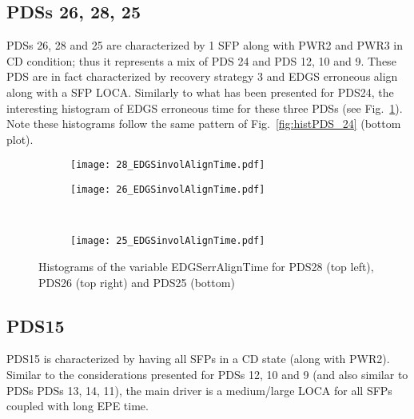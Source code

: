 \subsection{PDSs 26, 28, 25}
PDSs 26, 28 and 25 are characterized by 1 SFP along with PWR2 and PWR3 in CD condition; thus it 
represents a mix of PDS 24 and PDS 12, 10 and 9.
These PDS are in fact characterized by recovery strategy 3 and EDGS erroneous align along with a SFP LOCA.
Similarly to what has been presented for PDS24, the interesting histogram of EDGS erroneous time for 
these three PDSs (see Fig.~\ref{fig:histPDS_26_28_25_EDGSinvolAlignTime}). Note these histograms follow the same pattern 
of Fig.~\ref{fig:histPDS_24} (bottom plot).

\begin{figure}
  \begin{subfigure}{.5\linewidth}
    \centering
    \texttt{[image: 28\_EDGSinvolAlignTime.pdf]}
  \end{subfigure}%
  \begin{subfigure}{.5\linewidth}
    \centering
    \texttt{[image: 26\_EDGSinvolAlignTime.pdf]}
  \end{subfigure}\\[1ex]
  \begin{subfigure}{\linewidth}
    \centering
    \texttt{[image: 25\_EDGSinvolAlignTime.pdf]}
  \end{subfigure}
  \caption{Histograms of the variable EDGSerrAlignTime for PDS28 (top left), PDS26 (top right) and PDS25 (bottom)}
  \label{fig:histPDS_26_28_25_EDGSinvolAlignTime}
\end{figure}

\subsection{PDS15}
PDS15 is characterized by having all SFPs in a CD state (along with PWR2). Similar to the considerations 
presented for PDSs 12, 10 and 9 (and also
similar to PDSs PDSs 13, 14, 11), the main driver is a medium/large LOCA for all SFPs coupled with long EPE time.

